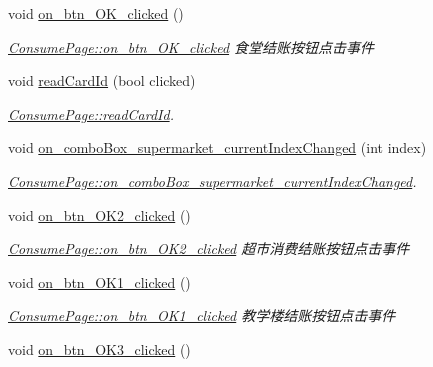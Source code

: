 \begin{DoxyCompactItemize}
\item 
void \mbox{\hyperlink{class_consume_page_a5d3f29ff49ea73facf73e34267adf0ed}{on\+\_\+btn\+\_\+\+O\+K\+\_\+clicked}} ()
\begin{DoxyCompactList}\small\item\em \mbox{\hyperlink{class_consume_page_a5d3f29ff49ea73facf73e34267adf0ed}{Consume\+Page\+::on\+\_\+btn\+\_\+\+O\+K\+\_\+clicked}} 食堂结账按钮点击事件 \end{DoxyCompactList}\item 
void \mbox{\hyperlink{class_consume_page_a00810bb404e95cf82b060d366a127b23}{read\+Card\+Id}} (bool clicked)
\begin{DoxyCompactList}\small\item\em \mbox{\hyperlink{class_consume_page_a00810bb404e95cf82b060d366a127b23}{Consume\+Page\+::read\+Card\+Id}}. \end{DoxyCompactList}\item 
void \mbox{\hyperlink{class_consume_page_a2456c0a7ad27aa1d991c4a2d9a3334e1}{on\+\_\+combo\+Box\+\_\+supermarket\+\_\+current\+Index\+Changed}} (int index)
\begin{DoxyCompactList}\small\item\em \mbox{\hyperlink{class_consume_page_a2456c0a7ad27aa1d991c4a2d9a3334e1}{Consume\+Page\+::on\+\_\+combo\+Box\+\_\+supermarket\+\_\+current\+Index\+Changed}}. \end{DoxyCompactList}\item 
void \mbox{\hyperlink{class_consume_page_a9ace94ec565505f97e29f0f732ef13bf}{on\+\_\+btn\+\_\+\+O\+K2\+\_\+clicked}} ()
\begin{DoxyCompactList}\small\item\em \mbox{\hyperlink{class_consume_page_a9ace94ec565505f97e29f0f732ef13bf}{Consume\+Page\+::on\+\_\+btn\+\_\+\+O\+K2\+\_\+clicked}} 超市消费结账按钮点击事件 \end{DoxyCompactList}\item 
void \mbox{\hyperlink{class_consume_page_aef47c443ac40ea430537571bae1328ff}{on\+\_\+btn\+\_\+\+O\+K1\+\_\+clicked}} ()
\begin{DoxyCompactList}\small\item\em \mbox{\hyperlink{class_consume_page_aef47c443ac40ea430537571bae1328ff}{Consume\+Page\+::on\+\_\+btn\+\_\+\+O\+K1\+\_\+clicked}} 教学楼结账按钮点击事件 \end{DoxyCompactList}\item 
void \mbox{\hyperlink{class_consume_page_a3d244573d28510df3c7b3ca0d6eb3843}{on\+\_\+btn\+\_\+\+O\+K3\+\_\+clicked}} ()

\end{DoxyCompactItemize}
